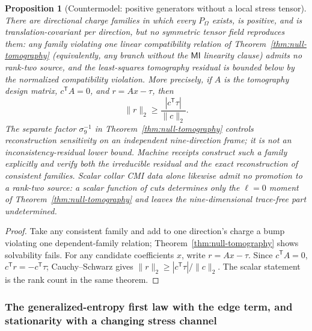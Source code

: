 \documentclass[11pt]{article}
\newtheorem{proposition}[theorem]{Proposition}
\begin{document}
\begin{proposition}[Countermodel: positive generators without a local stress tensor]
\label{prop:no-local-stress-countermodel}
There are directional charge families in which every \(P_\Omega\) exists,
is positive, and is translation-covariant \emph{per direction}, but no
symmetric tensor field reproduces them: any family violating one linear
compatibility relation of Theorem~\ref{thm:null-tomography} (equivalently,
any branch without the \(\mathsf{MI}\) linearity clause) admits no rank-two
source, and the least-squares tomography residual is bounded below by the
normalized compatibility violation. More precisely, if \(A\) is the
tomography design matrix, \(c^{\mathsf T}A=0\), and
\(r=Ax-\tau\), then
\[
\lVert r\rVert_2\geq
\frac{|c^{\mathsf T}\tau|}{\lVert c\rVert_2}.
\]
The separate factor \(\sigma_9^{-1}\) in
Theorem~\ref{thm:null-tomography} controls reconstruction sensitivity on an
independent nine-direction frame; it is not an inconsistency-residual lower
bound. Machine receipts construct such a family explicitly and verify both
the irreducible residual and the exact reconstruction of consistent families. Scalar
collar CMI data alone likewise admit no promotion to a rank-two source: a
scalar function of cuts determines only the \(\ell=0\) moment of
Theorem~\ref{thm:null-tomography} and leaves the nine-dimensional trace-free
part undetermined.
\end{proposition}

\begin{proof}
Take any consistent family and add to one direction's charge a bump violating
one dependent-family relation; Theorem~\ref{thm:null-tomography} shows
solvability fails. For any candidate coefficients \(x\), write
\(r=Ax-\tau\). Since \(c^{\mathsf T}A=0\),
\(c^{\mathsf T}r=-c^{\mathsf T}\tau\); Cauchy--Schwarz gives
\(\lVert r\rVert_2\geq
|c^{\mathsf T}\tau|/\lVert c\rVert_2\). The scalar statement is the rank
count in the same theorem.
\end{proof}

\subsubsection{The generalized-entropy first law with the edge term, and stationarity with a changing stress channel}
\label{subsubsec:entropy-bridge-repair}
\end{document}
